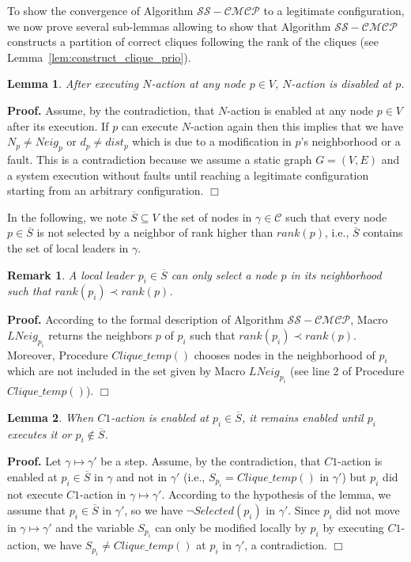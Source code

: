 \documentclass[11pt,letterpaper,onecolumn]{article}
\newtheorem{lemma}{Lemma}
\newenvironment{proof}{\noindent \begin{rm}{\textbf{Proof.} }}{\hspace*{\fill}$\Box$\par\end{rm} \vspace{.3cm}}
\newtheorem{rem}{Remark}
\begin{document}
To show the convergence of Algorithm $\mathcal{SS-CMCP}$ to a legitimate configuration, we now prove several sub-lemmas allowing to show that Algorithm $\mathcal{SS-CMCP}$ constructs a partition of correct cliques following the rank of the cliques (see Lemma~\ref{lem:construct_clique_prio}).

\begin{lemma}
\label{lem:N-action}
After executing $N$-action at any node $p \in V$, $N$-action is disabled at $p$.
\end{lemma}

\begin{proof}
Assume, by the contradiction, that $N$-action is enabled at any node $p \in V$ after its execution. If $p$ can execute $N$-action again then this implies that we have $N_p \neq Neig_p$ or $d_p \neq dist_p$ which is due to a modification in $p$'s neighborhood or a fault. This is a contradiction because we assume a static graph $G=(V,E)$ and a system execution without faults until reaching a legitimate configuration starting from an arbitrary configuration. 
\end{proof}

In the following, we note $\overline{S} \subseteq V$ the set of nodes in $\gamma \in \mathcal{C}$ such that every node $p \in \overline{S}$ is not selected by a neighbor of rank higher than $rank(p)$, i.e., $\overline{S}$ contains the set of local leaders in $\gamma$.

\begin{rem}
\label{rem:nodes_rank_clique}
A local leader $p_i \in \overline{S}$ can only select a node $p$ in its neighborhood such that $rank(p_i) \prec rank(p)$.
\end{rem}

\begin{proof}
According to the formal description of Algorithm $\mathcal{SS-CMCP}$, Macro $LNeig_{p_i}$ returns the neighbors $p$ of $p_i$ such that $rank(p_i) \prec rank(p)$. Moreover, Procedure $Clique\_temp()$ chooses nodes in the neighborhood of $p_i$ which are not included in the set given by Macro $LNeig_{p_i}$ (see line 2 of Procedure $Clique\_temp()$).
\end{proof}

\begin{lemma}
\label{lem:C1-action}
When $C1$-action is enabled at $p_i \in \overline{S}$, it remains enabled until $p_i$ executes it or $p_i \not \in \overline{S}$.
\end{lemma}

\begin{proof}
Let $\gamma \mapsto \gamma'$ be a step. Assume, by the contradiction, that $C1$-action is enabled at $p_i \in \overline{S}$ in $\gamma$ and not in $\gamma'$ (i.e., $S_{p_i}=Clique\_temp()$ in $\gamma'$) but $p_i$ did not execute $C1$-action in $\gamma \mapsto \gamma'$. According to the hypothesis of the lemma, we assume that $p_i \in \overline{S}$ in $\gamma'$, so we have $\neg Selected(p_i)$ in $\gamma'$. Since $p_i$ did not move in $\gamma \mapsto \gamma'$ and the variable $S_{p_i}$ can only be modified locally by $p_i$ by executing $C1$-action, we have $S_{p_i} \neq Clique\_temp()$ at $p_i$ in $\gamma'$, a contradiction.
\end{proof}
\end{document}
